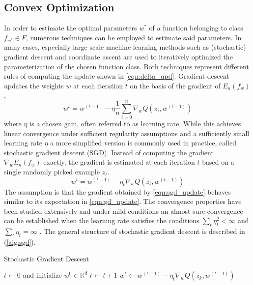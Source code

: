 \subsection{Convex Optimization}
\label{ss:optimization}
In order to estimate the optimal parameters $w^*$ of a function belonging to class $f_{w^*} \in F$, numerous techniques can be employed to estimate said parameters.
In many cases, especially large scale machine learning methods such as (stochastic) gradient descent and coordinate ascent are used to iteratively optimized the parameterization of the chosen function class.
Both techniques represent different rules of computing the update shown in \ref{eqn:delta_upd}.
Gradient descent updates the weights $w$ at each iteration $t$ on the basis of the gradient of $E_n(f_w)$,
\begin{equation}
w^{t} = w^{(t-1)} - \eta\frac{1}{n}\sum_{i=0}^{n}\nabla_wQ(z_i,w^{(t-1)})
\label{eqn:gd_update}
\end{equation}
where $\eta$ is a chosen gain, often referred to as learning rate.
While this achieves linear convergence under sufficient regularity assumptions and a sufficiently small learning rate $\eta$ \cite{dennis1996numerical} \cite{bottou2010large} a more simplified version is commonly used in practice, called stochastic gradient descent (SGD).
Instead of computing the gradient $\nabla_wE_n(f_w)$ exactly, the gradient is estimated at each iteration $t$ based on a single randomly picked example $z_t$.
\begin{equation}
w^{t} = w^{(t-1)} - \eta_t\nabla_wQ(z_t,w^{(t-1)})
\label{eqn:sgd_update}
\end{equation}
The assumption is that the gradient obtained by \ref{eqn:sgd_update} behaves similar to its expectation in \ref{eqn:gd_update}.
The convergence properties have been studied extensively and under mild conditions an almost sure convergence can be established when the learning rate satisfies the conditions $\sum_t\eta_t^2 < \infty$ and $\sum_t\eta_t = \infty$ \cite{bottou2010large}.
The general structure of stochastic gradient descent is described in (\ref{alg:sgd}).
\begin{algorithm}
\caption{Stochastic Gradient Descent}\label{alg:sgd}
\begin{algorithmic}[1]
\State $t\gets 0$ and initialize $w^0 \in \mathbb{R}^d$
\Repeat
\State $t \gets t + 1$
\State $w^{t} \gets w^{(t-1)} - \eta_t\nabla_wQ(z_k,w^{(t-1)})$
\EndFor
{}
\end{algorithmic}
\end{algorithm}
